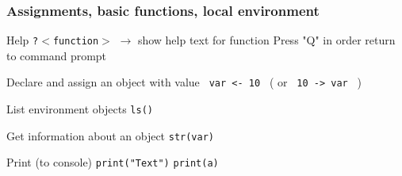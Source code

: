 \documentclass[ucs]{beamer}
\begin{document}
   \begin{frame}
    \frametitle{Assignments, basic functions, local environment}
  \begin{block}{Help}
    \texttt{?$<$function$>$} $\rightarrow$ show help text for function\newline
    Press "Q" in order return to command prompt
  \end{block}
  \begin{block}{Declare and assign an object with value}
    \texttt{ var <- 10 } ( or {\texttt{ 10 -> var }} )
  \end{block}
  \begin{block}{List environment objects}
  \texttt{ls()}
  \end{block}
  \begin{block}{Get information about an object}
  \texttt{str(var)}
  \end{block}
  \begin{block}{Print (to console)}
  \texttt{print("Text")}
    \texttt{print(a)}
  \end{block}
 \end{frame}  
\end{document}
